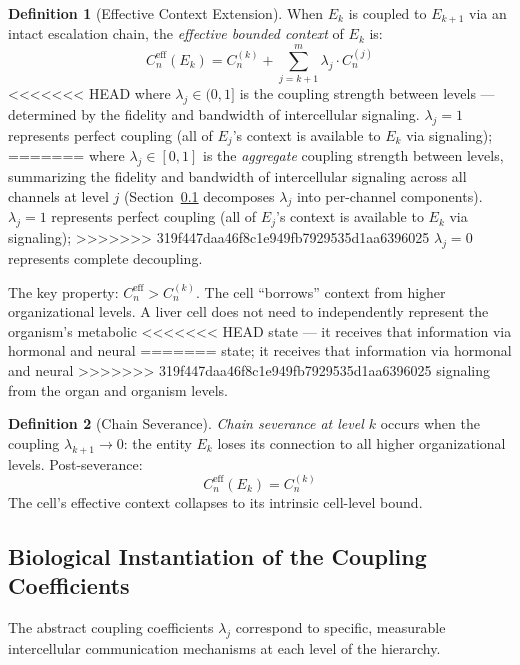 \documentclass[11pt]{article}
\theoremstyle{definition}
\newtheorem{definition}{Definition}
\theoremstyle{remark}
\begin{document}
\begin{definition}[Effective Context Extension]
\label{def:extension}
When $E_k$ is coupled to $E_{k+1}$ via an intact escalation chain,
the \emph{effective bounded context} of $E_k$ is:
\[
C_n^{\mathrm{eff}}(E_k) = C_n^{(k)} + \sum_{j=k+1}^{m}
\lambda_j \cdot C_n^{(j)}
\]
<<<<<<< HEAD
where $\lambda_j \in (0, 1]$ is the coupling strength between levels
--- determined by the fidelity and bandwidth of intercellular
signaling. $\lambda_j = 1$ represents perfect coupling (all of
$E_j$'s context is available to $E_k$ via signaling);
=======
where $\lambda_j \in [0, 1]$ is the \emph{aggregate} coupling strength
between levels, summarizing the fidelity and bandwidth of intercellular
signaling across all channels at level $j$
(Section~\ref{sec:coupling-biology} decomposes $\lambda_j$ into
per-channel components). $\lambda_j = 1$ represents perfect coupling
(all of $E_j$'s context is available to $E_k$ via signaling);
>>>>>>> 319f447daa46f8c1e949fb7929535d1aa6396025
$\lambda_j = 0$ represents complete decoupling.

The key property: $C_n^{\mathrm{eff}} > C_n^{(k)}$. The cell
``borrows'' context from higher organizational levels. A liver cell
does not need to independently represent the organism's metabolic
<<<<<<< HEAD
state --- it receives that information via hormonal and neural
=======
state; it receives that information via hormonal and neural
>>>>>>> 319f447daa46f8c1e949fb7929535d1aa6396025
signaling from the organ and organism levels.
\end{definition}

\begin{definition}[Chain Severance]
\label{def:severance}
\emph{Chain severance at level $k$} occurs when the coupling
$\lambda_{k+1} \to 0$: the entity $E_k$ loses its connection to all
higher organizational levels. Post-severance:
\[
C_n^{\mathrm{eff}}(E_k) = C_n^{(k)}
\]
The cell's effective context collapses to its intrinsic cell-level
bound.
\end{definition}

\subsection{Biological Instantiation of the Coupling Coefficients}
\label{sec:coupling-biology}

The abstract coupling coefficients $\lambda_j$ correspond to
specific, measurable intercellular communication mechanisms at each
level of the hierarchy.
\end{document}
